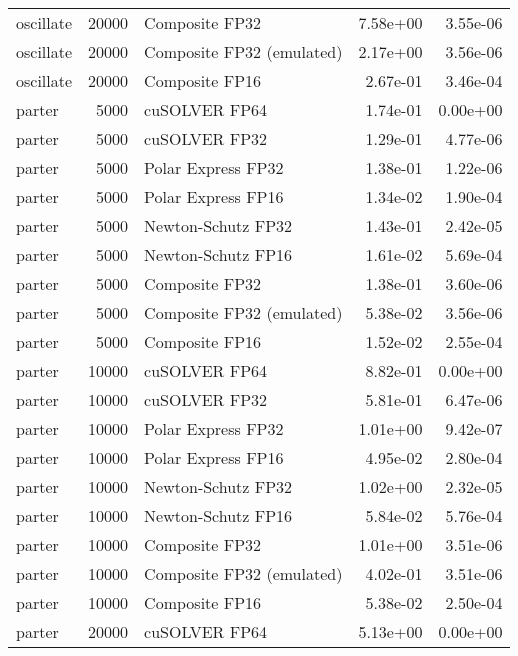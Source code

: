 \begin{table}
\begin{tabular}{lrlrr}
oscillate & 20000 &            Composite FP32 &  7.58e+00 &        3.55e-06 \\
oscillate & 20000 & Composite FP32 (emulated) &  2.17e+00 &        3.56e-06 \\
oscillate & 20000 &            Composite FP16 &  2.67e-01 &        3.46e-04 \\
   parter &  5000 &             cuSOLVER FP64 &  1.74e-01 &        0.00e+00 \\
   parter &  5000 &             cuSOLVER FP32 &  1.29e-01 &        4.77e-06 \\
   parter &  5000 &        Polar Express FP32 &  1.38e-01 &        1.22e-06 \\
   parter &  5000 &        Polar Express FP16 &  1.34e-02 &        1.90e-04 \\
   parter &  5000 &        Newton-Schutz FP32 &  1.43e-01 &        2.42e-05 \\
   parter &  5000 &        Newton-Schutz FP16 &  1.61e-02 &        5.69e-04 \\
   parter &  5000 &            Composite FP32 &  1.38e-01 &        3.60e-06 \\
   parter &  5000 & Composite FP32 (emulated) &  5.38e-02 &        3.56e-06 \\
   parter &  5000 &            Composite FP16 &  1.52e-02 &        2.55e-04 \\
   parter & 10000 &             cuSOLVER FP64 &  8.82e-01 &        0.00e+00 \\
   parter & 10000 &             cuSOLVER FP32 &  5.81e-01 &        6.47e-06 \\
   parter & 10000 &        Polar Express FP32 &  1.01e+00 &        9.42e-07 \\
   parter & 10000 &        Polar Express FP16 &  4.95e-02 &        2.80e-04 \\
   parter & 10000 &        Newton-Schutz FP32 &  1.02e+00 &        2.32e-05 \\
   parter & 10000 &        Newton-Schutz FP16 &  5.84e-02 &        5.76e-04 \\
   parter & 10000 &            Composite FP32 &  1.01e+00 &        3.51e-06 \\
   parter & 10000 & Composite FP32 (emulated) &  4.02e-01 &        3.51e-06 \\
   parter & 10000 &            Composite FP16 &  5.38e-02 &        2.50e-04 \\
   parter & 20000 &             cuSOLVER FP64 &  5.13e+00 &        0.00e+00 \\

\end{tabular}
\end{table}
